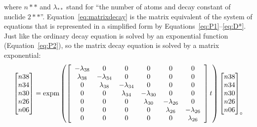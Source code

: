 \begin{refsection}
\noindent where $n\ast\ast$ and $\lambda_{\ast\ast}$ stand for ``the
number of atoms and decay constant of nuclide $2\ast\ast$''.
Equation~\ref{eq:matrixdecay} is the matrix equivalent of the system
of equations that is represented in a simplified form by
Equations~\ref{eq:P1}--\ref{eq:D*}.  Just like the ordinary decay
equation is solved by an exponential function (Equation~\ref{eq:P2}),
so the matrix decay equation is solved by a matrix exponential:
\begin{equation}
  \left[
    \begin{array}{@{}c@{}}
      n38\\
      n34\\
      n30\\
      n26\\
      n06
    \end{array}
  \right]
  =
  \mbox{expm}\left(
  \left[
    \begin{array}{cccccc}
      -\lambda_{38} & 0 & 0 & 0 & 0 & 0 \\
      \lambda_{38} & -\lambda_{34} & 0 & 0 & 0 & 0 \\
      0 & \lambda_{38} & -\lambda_{34} & 0 & 0 & 0 \\
      0 & 0 & \lambda_{34} & -\lambda_{30} & 0 & 0 \\
      0 & 0 & 0 & \lambda_{30} & -\lambda_{26} & 0 \\
      0 & 0 & 0 & 0 & \lambda_{26} & -\lambda_{26} \\
      0 & 0 & 0 & 0 & 0 & \lambda_{26}\\
    \end{array}
    \right]
  t
  \right)
  \left[
    \begin{array}{@{}c@{}}
      n38\\
      n34\\
      n30\\
      n26\\
      n06
    \end{array}
    \right]_\circ
  \label{eq:matrixdecaysolution}
\end{equation}


\end{refsection}
